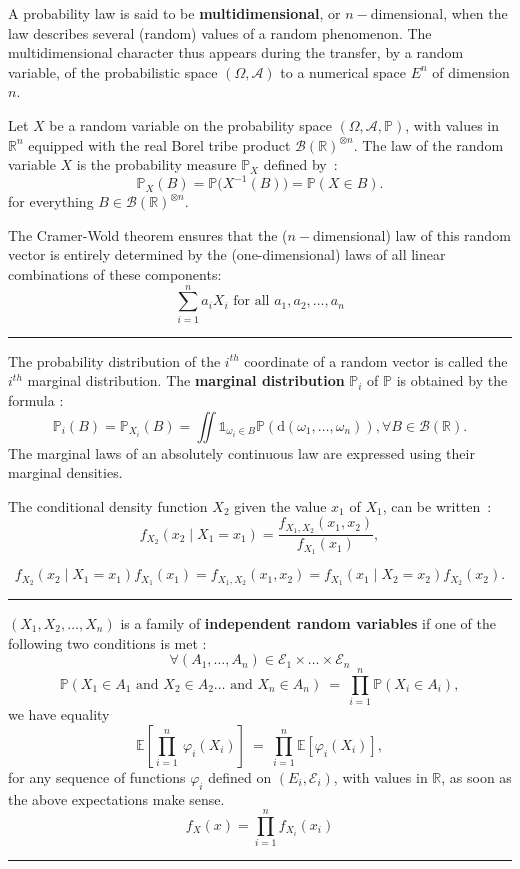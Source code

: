 \begin{f}
			
			
A probability law is said to be \textbf{multidimensional}, or \(n-\)dimensional, when the law describes several (random) values of a random phenomenon.
The multidimensional character thus appears during the transfer, by a random variable, of the probabilistic space \((\Omega,\mathcal{A})\) to a numerical space \(E^n\) of dimension \(n\).

Let \(X\) be a random variable on the probability space \((\Omega, \mathcal A, \mathbb{P})\), with values in \({\mathbb{R}}^n\) equipped with the real Borel tribe product \({\mathcal {B}(\mathbb{R})}^{\otimes n}\).
The law of the random variable \(X\) is the probability measure \(\mathbb{P}_X\) defined by~:
\[
\mathbb{P}_X(B) = \mathbb{P}\big(X^{-1}(B)\big) = \mathbb{P}(X \in B).
\]
for everything \(B \in {\mathcal B(\mathbb R)}^{\otimes n}\).

The Cramer-Wold theorem ensures that the (\(n-\)dimensional) law of this random vector is entirely determined by the (one-dimensional) laws of all linear combinations of these components:
\[\sum_{i = 1}^n a_i X_i\mbox{ for all }a_1, a_2, \dots, a_n\]


\end{f}
\hrule

\begin{f}
The probability distribution of the \(i^{th}\) coordinate of a random vector is called the \(i^{th}\) marginal distribution. The \textbf{marginal distribution} \(\mathbb{P}_i\) of \(\mathbb{P}\) is obtained by the formula :
\[
\mathbb{P}_i(B) = \mathbb{P}_{X_i}(B) = \iint { \mathds{1}}_{\omega_i\in B} \mathbb{P}(\mathrm{d}(\omega_1,\dots,\omega_n)), \forall  B \in \mathcal B(\mathbb{R}).
\]
The marginal laws of an absolutely continuous law are expressed using their marginal densities.


The conditional density function \(X_2\) given the value \(x_1\) of \(X_1\), can be written~:
\[
f_{X_2}(x_2 \mid X_1=x_1) = \frac{f_{X_1, X_2}(x_1,x_2)}{f_{X_1}(x_1)}, 
\]

\[
f_{X_2}(x_2 \mid X_1=x_1)f_{X_1}(x_1) = f_{X_1,X_2}(x_1, x_2) = f_{X_1}(x_1 \mid X_2=x_2)f_{X_2}(x_2). 
\]
\end{f}
\hrule

	\begin{f}[Independence]
\((X_1, X_2, \dots,X_n)\) is a family of \textbf{independent random variables} if one of the following two conditions is met :
\[
\forall (A_1,\dots,A_n)\in\mathcal{E}_1\times\dots\times\mathcal{E}_n
\]
\[
\mathbb{P}(X_1\in A_1\text{ and }X_2\in A_2\dots\text{ and }X_n\in A_n)\ =\ \prod_{i=1}^n\mathbb{P}(X_i\in A_i),
\]
we have equality
\[
\mathbb{E}\left[\prod_{i=1}^n\ \varphi_i(X_i)\right]\ =\ \prod_{i=1}^n\mathbb{E}\left[\varphi_i(X_i)\right],
\]
for any sequence of functions \(\varphi_i\) defined on \((E_i,\mathcal{E}_i)\), with values in \(\mathbb{R}\), as soon as the above expectations make sense.
\[
f_X(x)= \prod_{i=1}^{n}f_{X_i}(x_i)
\]
\end{f}
\hrule



